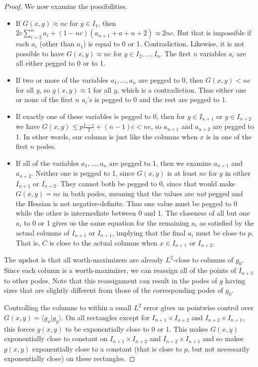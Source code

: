 \documentclass[12pt]{amsart}
\newcommand{\Value}{worth}
\begin{document}
{\begin{proof}
We now examine the possibilities. 
\begin{itemize}
\item If $G(x,y) \approx nc$ for $y\in I_1$, then $2c\sum_{i=2}^n a_i + (1-nc) (a_{n+1}+a+{n+2})
\approx 2nc$. But that is impossible if each $a_i$ (other than $a_1$) is equal to 0 or 1. 
Contradiction. Likewise, it is not possible to have $G(x,y) \approx nc$ for $y \in I_2, \ldots, I_n$.
The first $n$ variables $a_i$ are all either pegged to 0 or to 1. 
\item If two or more of the variables $a_1, \ldots, a_n$ are pegged to 0, then $G(x,y) < nc$ for 
all $y$, so $g(x,y) \approx 1$ for all $y$, which is a contradiction. Thus either one or none 
of the first $n$ $a_i$'s is pegged to 0 and the rest are pegged to 1. 
\item If exactly one of these variables is pegged to 0, then for $y\in I_{n+1}$ or $y\in I_{n+2}$ 
we have $G(x,y) \le p \frac{1-c}{2} + (n-1) c < nc$, so $a_{n+1}$ and $a_{n+2}$ are pegged to 1. 
In other words, our column is just like the columns when $x$ is in one of the first $n$ podes.  
\item If all of the variables $a_1, \ldots, a_n$ are pegged to 1, then we examine $a_{n+1}$ and 
$a_{n+2}$. Neither one is pegged to 1, since $G(x,y)$ is at least $nc$ for $y$ in either $I_{n+1}$ or 
$I_{n+2}$. They cannot both be pegged to 0, since that would make $G(x,y)=nc$ in both podes, meaning
that the values are {\em not} pegged and the Hessian is not negative-definite. 
Thus one value must be pegged to 0 while the other is intermediate between 0 and 1. 
The closeness of all but one $a_i$ to 0 or 1 gives us the same equation
for the remaining $a_i$ as satisfied by the actual columns of $I_{n+1}$
or $I_{n+1}$, implying that the final $a_i$ must be close to $p$. That
is, $C$ is close to the actual columns when $x \in I_{n+1}$ or $I_{n+2}$.
\end{itemize}

The upshot is that all \Value-maximizers are already $L^2$-close 
to columns
of $g_0$. Since each column is a \Value-maximizer, we can reassign 
all of the points of $I_{n+3}$ to other podes. Note that this reassignment
can result in the podes of $g$ having sizes that are slightly 
different from those of the
corresponding podes of $g_0$. 

Controlling the columns to within a small $L^2$ error gives us pointwise
control over $G(x,y) = \langle g_x | g_y \rangle$. 
On all rectangles except for $I_{n+1}\times 
I_{n+2}$ and $I_{n+2} \times I_{n+1}$, this forces $g(x,y)$ to be 
exponentially close to 0 or 1. This makes $G(x,y)$ exponentially close
to constant on $I_{n+1} \times I_{n+2}$ and $I_{n+2} \times I_{n+1}$
and so makes $g(x,y)$ exponentially close to a constant (that is 
close to $p$, but not necessarily exponentially close) on these
rectangles. 



\end{proof}}
\end{document}
